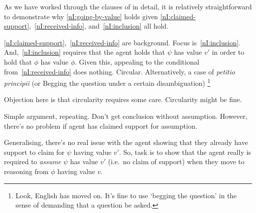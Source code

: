 \begin{note}
  \color{red}
  
\end{note}

\begin{note}[Outline]
  As we have worked through the clauses of \nI{} in detail, it is relatively straightforward to demonstrate why \ref{nI:going-by-value} holds given \ref{nI:claimed-support},~\ref{nI:received-info}, and~\ref{nI:inclusion} all hold.

  \ref{nI:claimed-support},~\ref{nI:received-info} are background.
  Focus is~\ref{nI:inclusion}.
  And,~\ref{nI:inclusion} requires that the agent holds that \(\psi\) has value \(v'\) in order to hold that \(\phi\) has value \(\phi\).
  Given this, appealing to the conditional from~\ref{nI:received-info} does nothing.
  Circular.
  Alternatively, a case of \emph{petitio principii} (or Begging the question under a certain disambiguation)\nolinebreak
  \footnote{
    Look, English has moved on.
    It's fine to use `begging the question' in the sense of demanding that a question be asked.
  }

  Objection here is that circularity requires some care.
  Circularity might be fine.

  Simple argument, repeating.
  Don't get conclusion without assumption.
  However, there's no problem if agent has claimed support for assumption.

  Generalising, there's no real issue with the agent showing that they already have support to claim for \(\psi\) having value \(v'\).
  So, task is to show that the agent really is required to \emph{assume} \(\psi\) has value \(v'\) (i.e.\ no claim of support) when they move to reasoning from \(\phi\) having value \(v\).
\end{note}



